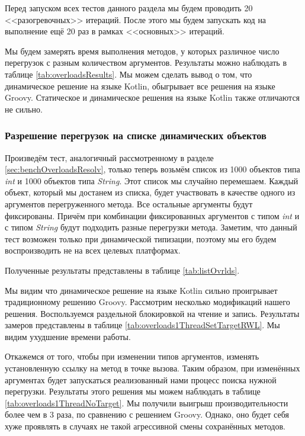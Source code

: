 Перед запуском всех тестов данного раздела мы будем проводить 20 <<разогревочных>> итераций. После этого мы будем запускать код на выполнение ещё 20 раз в рамках <<основных>> итераций.

Мы будем замерять время выполнения методов, у которых различное число перегрузок с разным количеством аргументов. Результаты можно наблюдать в таблице  \ref{tab:overloadsResults}. Мы можем сделать вывод о том, что динамическое решение на языке Kotlin, обыгрывает все решения на языке Groovy. Статическое и динамическое решения на языке Kotlin также отличаются не сильно.

\subsubsection{Разрешение перегрузок на списке динамических объектов}
\label{sec:listDynObjects}

Произведём тест, аналогичный рассмотренному в разделе \ref{sec:benchOverloadsResolv}, только теперь возьмём список из 1000 объектов типа \textit{int} и 1000 объектов типа \textit{String}. Этот список мы случайно перемешаем. Каждый объект, который мы достанем из списка, будет участвовать в качестве одного из аргументов перегруженного метода. Все остальные аргументы будут фиксированы. Причём при комбинации фиксированных аргументов с типом \textit{int} и с типом \textit{String} будут подходить разные перегрузки метода. Заметим, что данный тест возможен только при динамической типизации, поэтому мы его будем воспроизводить не на всех целевых платформах.

Полученные результаты представлены в таблице \ref{tab:listOvrlds}.

Мы видим что динамическое решение на языке Kotlin сильно проигрывает традиционному решению Groovy. Рассмотрим несколько модификаций нашего решения. Воспользуемся раздельной блокировкой на чтение и запись. Результаты замеров представлены в таблице \ref{tab:overloads1ThreadSetTargetRWL}. Мы видим ухудшение времени работы.

Откажемся от того, чтобы при изменении типов аргументов, изменять установленную ссылку на метод в точке вызова. Таким образом, при изменённых аргументах будет запускаться реализованный нами процесс поиска нужной перегрузки.
Результаты этого решения мы можем наблюдать в таблице  \ref{tab:overloads1ThreadNoTarget}. Мы получили выигрыш производительности более чем в 3 раза, по сравнению с решением Groovy. Однако, оно будет себя хуже проявлять в случаях не такой агрессивной смены сохранённых методов.

